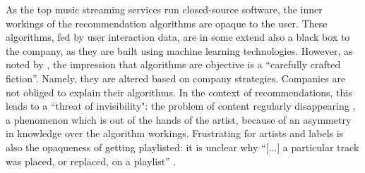 As the top music streaming services run closed-source software, the inner workings of the recommendation algorithms are opaque to the user. These algorithms, fed by user interaction data, are in some extend also a black box to the company, as they are built using machine learning technologies. However, as noted by \citep{gillespie2014relevance}, the impression that algorithms are objective is a ``carefully crafted fiction''. Namely, they are altered based on company strategies. Companies are not obliged to explain their algorithms. In the context of recommendations, this leads to a ``threat of invisibility": the problem of content regularly disappearing \citep{bucher2018if}, a phenomenon which is out of the hands of the artist, because of an asymmetry in knowledge over the algorithm workings. Frustrating for artists and labels is also the opaqueness of getting playlisted: it is unclear why ``[...] a particular track was placed, or replaced, on a playlist'' \citep{prey2020locating}.
